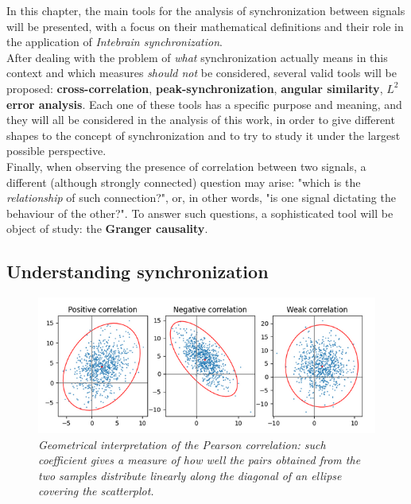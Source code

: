 \documentclass[a4paper]{article}
\begin{document}
In this chapter, the main tools for the analysis of synchronization between signals will be presented, with a focus on their mathematical definitions and their role in the application of \textit{Intebrain synchronization}.\\
After dealing with the problem of \textit{what} synchronization actually means in this context and which measures \textit{should not} be considered, several valid tools will be proposed:\textbf{ cross-correlation}, \textbf{peak-synchronization}, \textbf{angular similarity}, \textbf{$L^2$ error analysis}. Each one of these tools has a specific purpose and meaning, and they will all be considered in the analysis of this work, in order to give different shapes to the concept of synchronization and to try to study it under the largest possible perspective.\\
Finally, when observing the presence of correlation between two signals, a different (although strongly connected) question may arise: "which is the \textit{relationship} of such connection?", or, in other words, "is one signal dictating the behaviour of the other?". To answer such questions, a sophisticated tool will be object of study: the \textbf{Granger causality}.

 
\subsection{Understanding synchronization}

\begin{figure}[H]
	\begin{center}
		\includegraphics[scale=.75]{pearson.png} 
	\end{center} 
	\caption{\textit{Geometrical interpretation of the Pearson correlation: such coefficient gives a measure of how well the pairs obtained from the two samples distribute linearly along the diagonal of an ellipse covering the scatterplot. }}
	
\end{figure}
\end{document}
